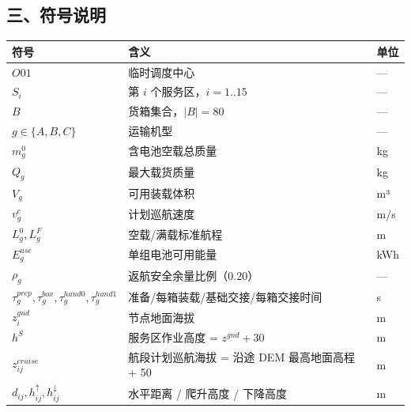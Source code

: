 \documentclass[
  10.5pt,
]{article}
\newcounter{none} %
\begin{document}
\subsection{三、符号说明}\label{ux4e09ux7b26ux53f7ux8bf4ux660e}

{\def\LTcaptype{none} %
\begin{longtable}[]{@{}
  >{\raggedright\arraybackslash}p{}
  >{\raggedright\arraybackslash}p{}
  >{\raggedright\arraybackslash}p{}@{}}
\toprule\noalign{}
\begin{minipage}[b]{\linewidth}\raggedright
符号
\end{minipage} & \begin{minipage}[b]{\linewidth}\raggedright
含义
\end{minipage} & \begin{minipage}[b]{\linewidth}\raggedright
单位
\end{minipage} \\
\midrule\noalign{}
\endhead
\bottomrule\noalign{}
\endlastfoot
\(O01\) & 临时调度中心 & --- \\
\(S_i\) & 第 \(i\) 个服务区，\(i=1..15\) & --- \\
\(B\) & 货箱集合，\(\lvert B\rvert=80\) & --- \\
\(g\in\{A,B,C\}\) & 运输机型 & --- \\
\(m^0_g\) & 含电池空载总质量 & kg \\
\(Q_g\) & 最大载货质量 & kg \\
\(V_g\) & 可用装载体积 & m³ \\
\(v^c_g\) & 计划巡航速度 & m/s \\
\(L^0_g,L^F_g\) & 空载/满载标准航程 & m \\
\(E^{use}_g\) & 单组电池可用能量 & kWh \\
\(\rho_g\) & 返航安全余量比例（0.20） & --- \\
\(\tau^{prep}_g,\tau^{box}_g,\tau^{hand0}_g,\tau^{hand1}_g\) &
准备/每箱装载/基础交接/每箱交接时间 & s \\
\(z^{gnd}_i\) & 节点地面海拔 & m \\
\(h^{S}\) & 服务区作业高度 = \(z^{gnd}+30\) & m \\
\(z^{cruise}_{ij}\) & 航段计划巡航海拔 = 沿途 DEM 最高地面高程 + 50 &
m \\
\(d_{ij},h^\uparrow_{ij},h^\downarrow_{ij}\) & 水平距离 / 爬升高度 /
下降高度 & m \\

\end{longtable}}
\end{document}

